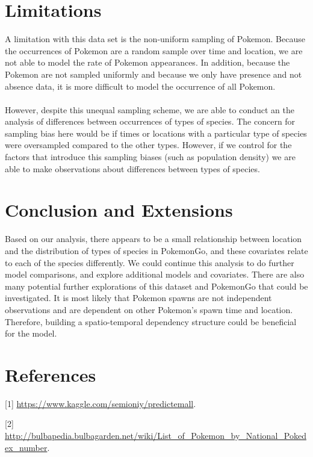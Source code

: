 \documentclass{article}
\begin{document}
\section{Limitations}

A limitation with this data set is the non-uniform sampling of Pokemon. Because the occurrences of Pokemon are a random sample over time and location, we are not able to model the rate of Pokemon appearances. In addition, because the Pokemon are not sampled uniformly and because we only have presence and not absence data, it is more difficult to model the occurrence of all Pokemon. \\ 
\\ 
However, despite this unequal sampling scheme, we are able to conduct an the analysis of differences between occurrences of types of species. The concern for sampling bias here would be if times or locations with a particular type of species were oversampled compared to the other types. However, if we control for the factors that introduce this sampling biases (such as population density) we are able to make observations about differences between types of species. 

\section{Conclusion and Extensions}

Based on our analysis, there appears to be a small relationship between location and the distribution of types of species in PokemonGo, and these covariates relate to each of the species differently. We could continue this analysis to do further model comparisons, and explore additional models and covariates. There are also many potential further explorations of this dataset and PokemonGo that could be investigated. It is most likely that Pokemon spawns are not independent observations and are dependent on other Pokemon's spawn time and location. Therefore, building a spatio-temporal dependency structure could be beneficial for the model. 

\newpage
\section{References}

\hypertarget{Ref1}{[1] \url{https://www.kaggle.com/semioniy/predictemall}.}

\noindent \hypertarget{Ref2}{[2] \url{http://bulbapedia.bulbagarden.net/wiki/List_of_Pokemon_by_National_Pokedex_number}.}
\end{document}
